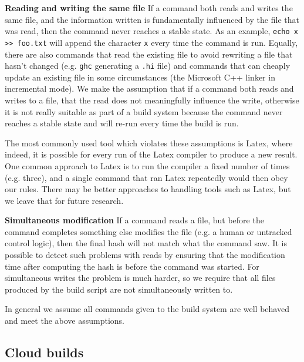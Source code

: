 \textbf{Reading and writing the same file} If a command both reads and writes the same file, and the information written is fundamentally influenced by the file that was read, then the command never reaches a stable state. As an example, \verb"echo x >> foo.txt" will append the character \texttt{x} every time the command is run. Equally, there are also commands that read the existing file to avoid rewriting a file that hasn't changed (e.g. \texttt{ghc} generating a \texttt{.hi} file) and commands that can cheaply update an existing file in some circumstances (the Microsoft C++ linker in incremental mode). We make the assumption that if a command both reads and writes to a file, that the read does not meaningfully influence the write, otherwise it is not really suitable as part of a build system because the command never reaches a stable state and will re-run every time the build is run.

The most commonly used tool which violates these assumptions is Latex, where indeed, it is possible for every run of the Latex compiler to produce a new result. One common approach to Latex is to run the compiler a fixed number of times (e.g. three), and a single command that ran Latex repeatedly would then obey our rules. There may be better approaches to handling tools such as Latex, but we leave that for future research.



\textbf{Simultaneous modification} If a command reads a file, but before the command completes something else modifies the file (e.g. a human or untracked control logic), then the final hash will not match what the command saw. It is possible to detect such problems with reads by ensuring that the modification time after computing the hash is before the command was started. For simultaneous writes the problem is much harder, so we require that all files produced by the build script are not simultaneously written to.

\postparagraphs In general we assume all commands given to the build system are well behaved and meet the above assumptions.

\subsection{Cloud builds}
\label{sec:cloud_builds}

